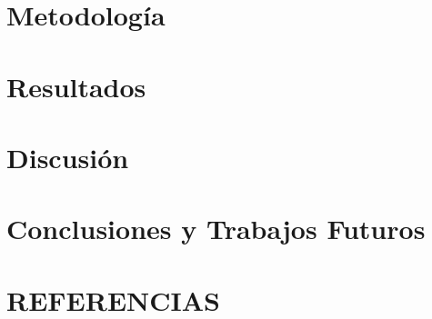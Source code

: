 \documentclass[12pt, oneside]{book}
\begin{document}
\chapter{Metodología}
\thispagestyle{empty}


\chapter{Resultados}
\thispagestyle{empty}


\chapter{Discusión}
\thispagestyle{empty}


\vspace{0.5cm}
\chapter{Conclusiones y Trabajos Futuros}
\thispagestyle{empty}


\chapter*{REFERENCIAS}
\printbibliography[heading=none]

\printindex
\end{document}
